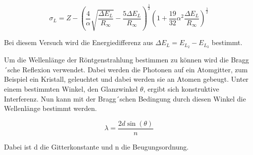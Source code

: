 \begin{equation}
  \sigma_L = Z - \left( \frac{4}{\alpha} \sqrt{\frac{\Delta E_L}{R_\infty}}
  - \frac{5 \Delta E_L}{R_\infty} \right)^{\frac{1}{2}} \left(
  1 + \frac{19}{32} \alpha^2 \frac{\Delta E_L}{R_\infty} \right)^{\frac{1}{2}}
  \label{eq:4}
\end{equation}

Bei diesem Versuch wird die Energiedifferenz aus $\Delta E_L = E_{L_2} - E_{L_3}$
bestimmt.

Um die Wellenlänge der Röntgenstrahlung bestimmen zu können wird die Bragg´sche
Reflexion verwendet. Dabei werden die Photonen auf ein Atomgitter, zum Beispiel
ein Kristall, geleuchtet und dabei werden sie an Atomen gebeugt. Unter einem
bestimmten Winkel, den Glanzwinkel $\theta$, ergibt sich konstruktive Interferenz.
Nun kann mit der Bragg´schen Bedingung durch diesen Winkel die Wellenlänge bestimmt werden.

\begin{equation}
  \lambda = \frac{2d \sin(\theta)}{n}
  \label{eq:5}
\end{equation}

Dabei ist d die Gitterkonstante und n die Beugungsordnung.
